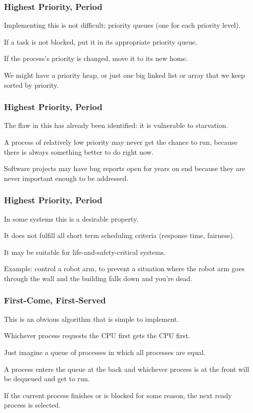 \begin{frame}
\frametitle{Highest Priority, Period}

Implementing this is not difficult; priority queues (one for each priority level).

If a task is not blocked, put it in its appropriate priority queue. 
 
If the process's priority is changed, move it to its new home. 

We might have a priority heap, or just one big linked list or array that we keep sorted by priority.

\end{frame}

\begin{frame}
\frametitle{Highest Priority, Period}

The flaw in this has already been identified: it is vulnerable to starvation. 

A process of relatively low priority may never get the chance to run, because there is always something better to do right now. 

Software projects may have bug reports open for years on end because they are never important enough to be addressed.

\end{frame}

\begin{frame}
\frametitle{Highest Priority, Period}

In some systems this is a desirable property. 

It does not fulfill all short term scheduling criteria (response time, fairness). 

It may be suitable for life-and-safety-critical systems.

Example: control a robot arm, to prevent a situation where the robot arm goes through the wall and the building falls down and you're dead.


\end{frame}

\begin{frame}
\frametitle{First-Come, First-Served}

This is an obvious algorithm that is simple to implement. 

Whichever process requests the CPU first gets the CPU first. 

Just imagine a queue of processes in which all processes are equal. 

A process enters the queue at the back and whichever process is at the front will be dequeued and get to run.  

If the current process finishes or is blocked for some reason, the next ready process is selected. 


\end{frame}

